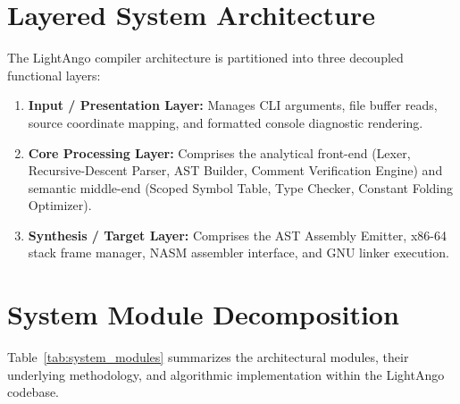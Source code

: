 \section{Layered System Architecture}
The LightAngo compiler architecture is partitioned into three decoupled functional layers:
\begin{enumerate}
    \item \textbf{Input / Presentation Layer:} Manages CLI arguments, file buffer reads, source coordinate mapping, and formatted console diagnostic rendering.
    \item \textbf{Core Processing Layer:} Comprises the analytical front-end (Lexer, Recursive-Descent Parser, AST Builder, Comment Verification Engine) and semantic middle-end (Scoped Symbol Table, Type Checker, Constant Folding Optimizer).
    \item \textbf{Synthesis / Target Layer:} Comprises the AST Assembly Emitter, x86-64 stack frame manager, NASM assembler interface, and GNU linker execution.
\end{enumerate}

\section{System Module Decomposition}
Table~\ref{tab:system_modules} summarizes the architectural modules, their underlying methodology, and algorithmic implementation within the LightAngo codebase.

